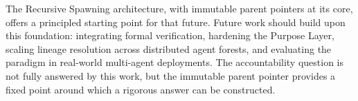 The Recursive Spawning architecture, with immutable parent pointers at its core, offers a principled starting point for that future. Future work should build upon this foundation: integrating formal verification, hardening the Purpose Layer, scaling lineage resolution across distributed agent forests, and evaluating the paradigm in real-world multi-agent deployments. The accountability question is not fully answered by this work, but the immutable parent pointer provides a fixed point around which a rigorous answer can be constructed.


% 
% 

